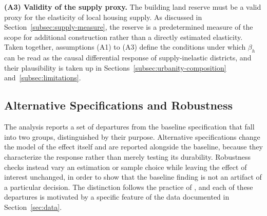 \documentclass[a4paper,12pt, headsepline]{scrartcl}
\numberwithin{equation}{section}
\begin{document}
\textbf{(A3) Validity of the supply proxy.} The building land reserve must be a valid proxy for the elasticity of local housing supply. As discussed in Section~\ref{subsec:supply-measure}, the reserve is a predetermined measure of the scope for additional construction rather than a directly estimated elasticity. Taken together, assumptions (A1) to (A3) define the conditions under which $\beta_h$ can be read as the causal differential response of supply-inelastic districts, and their plausibility is taken up in Sections~\ref{subsec:urbanity-composition} and~\ref{subsec:limitations}.

\subsection{Alternative Specifications and Robustness}\label{subsec:robustness-strategy}
The analysis reports a set of departures from the baseline specification that fall into two groups, distinguished by their purpose. Alternative specifications change the model of the effect itself and are reported alongside the baseline, because they characterize the response rather than merely testing its durability. Robustness checks instead vary an estimation or sample choice while leaving the effect of interest unchanged, in order to show that the baseline finding is not an artifact of a particular decision. The distinction follows the practice of \citet{aastveit2022}, and each of these departures is motivated by a specific feature of the data documented in Section~\ref{sec:data}.
\end{document}
